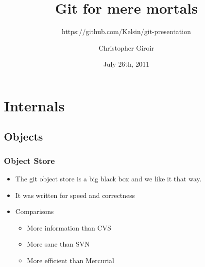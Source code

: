 \usepackage{color}
\usepackage{float}



\usepackage{beamerthemesplit}


\title{Git for mere mortals}
\subtitle{https://github.com/Kelsin/git-presentation}
\author{Christopher Giroir}
\date{July 26th, 2011}

\newcommand{\dia}[1]{\begin{figure}[H]\centerline{\xymatrix{#1}}\end{figure}}
\newcommand{\code}[2]{\ttfamily\begin{block}{\textnormal{#1}}#2\end{block}\normalfont}



\maketitle

\begin{frame}
  \titlepage
\end{frame}

\begin{frame}
  \tableofcontents
\end{frame}

\section{Internals}

\subsection{Objects}

\begin{frame}
  \frametitle{Object Store}
  \begin{itemize}
  \item The git object store is a big black box and we like it that way.
  \pause
  \item It was written for speed and correctness
  \pause
  \item Comparisons
    \begin{itemize}
    \item More information than CVS
    \item More sane than SVN
    \item More efficient than Mercurial
    \end{itemize}
  \end{itemize}
\end{frame}

